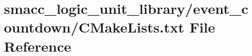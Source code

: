 \hypertarget{smacc__logic__unit__library_2event__countdown_2CMakeLists_8txt}{}\section{smacc\+\_\+logic\+\_\+unit\+\_\+library/event\+\_\+countdown/\+C\+Make\+Lists.txt File Reference}
\label{smacc__logic__unit__library_2event__countdown_2CMakeLists_8txt}
